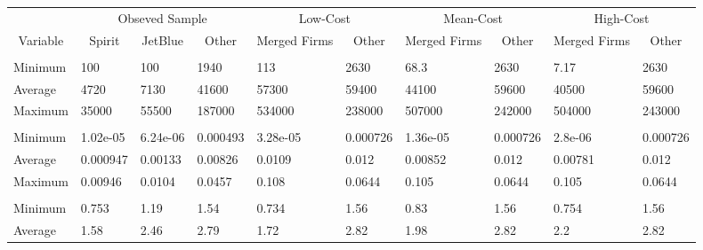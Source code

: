 
\begin{tabular}[t]{llllllllll}
\toprule
\multicolumn{1}{c}{ } & \multicolumn{3}{c}{Obseved Sample} & \multicolumn{2}{c}{Low-Cost} & \multicolumn{2}{c}{Mean-Cost} & \multicolumn{2}{c}{High-Cost} \\
\cmidrule(l{3pt}r{3pt}){2-4} \cmidrule(l{3pt}r{3pt}){5-6} \cmidrule(l{3pt}r{3pt}){7-8} \cmidrule(l{3pt}r{3pt}){9-10}
\multicolumn{1}{c}{Variable} & \multicolumn{1}{c}{Spirit} & \multicolumn{1}{c}{JetBlue} & \multicolumn{1}{c}{Other} & \multicolumn{1}{c}{Merged Firms} & \multicolumn{1}{c}{Other} & \multicolumn{1}{c}{Merged Firms} & \multicolumn{1}{c}{Other} & \multicolumn{1}{c}{Merged Firms} & \multicolumn{1}{c}{Other} \\
\cmidrule(l{3pt}r{3pt}){1-1} \cmidrule(l{3pt}r{3pt}){2-2} \cmidrule(l{3pt}r{3pt}){3-3} \cmidrule(l{3pt}r{3pt}){4-4} \cmidrule(l{3pt}r{3pt}){5-5} \cmidrule(l{3pt}r{3pt}){6-6} \cmidrule(l{3pt}r{3pt}){7-7} \cmidrule(l{3pt}r{3pt}){8-8} \cmidrule(l{3pt}r{3pt}){9-9} \cmidrule(l{3pt}r{3pt}){10-10}
\addlinespace[0.3em]
\multicolumn{10}{l}{\textbf{Passengers}}\\
\hspace{1em}Minimum & 100 & 100 & 1940 & 113 & 2630 & 68.3 & 2630 & 7.17 & 2630\\
\hspace{1em}Average & 4720 & 7130 & 41600 & 57300 & 59400 & 44100 & 59600 & 40500 & 59600\\
\hspace{1em}Maximum & 35000 & 55500 & 187000 & 534000 & 238000 & 507000 & 242000 & 504000 & 243000\\
\addlinespace[0.3em]
\multicolumn{10}{l}{\textbf{Market Share}}\\
\hspace{1em}Minimum & 1.02e-05 & 6.24e-06 & 0.000493 & 3.28e-05 & 0.000726 & 1.36e-05 & 0.000726 & 2.8e-06 & 0.000726\\
\hspace{1em}Average & 0.000947 & 0.00133 & 0.00826 & 0.0109 & 0.012 & 0.00852 & 0.012 & 0.00781 & 0.012\\
\hspace{1em}Maximum & 0.00946 & 0.0104 & 0.0457 & 0.108 & 0.0644 & 0.105 & 0.0644 & 0.105 & 0.0644\\
\addlinespace[0.3em]
\multicolumn{10}{l}{\textbf{Prices}}\\
\hspace{1em}Minimum & 0.753 & 1.19 & 1.54 & 0.734 & 1.56 & 0.83 & 1.56 & 0.754 & 1.56\\
\hspace{1em}Average & 1.58 & 2.46 & 2.79 & 1.72 & 2.82 & 1.98 & 2.82 & 2.2 & 2.82\\

\end{tabular}
